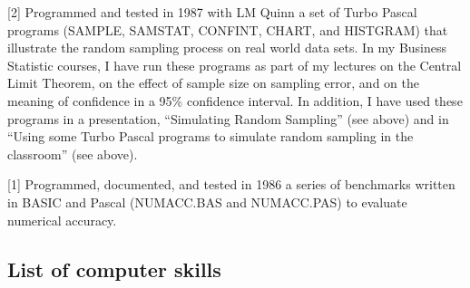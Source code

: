 \documentclass[
  12pt,
]{article}
\begin{document}
{[}2{]} Programmed and tested in 1987 with LM Quinn a set of Turbo
Pascal programs (SAMPLE, SAMSTAT, CONFINT, CHART, and HISTGRAM) that
illustrate the random sampling process on real world data sets. In my
Business Statistic courses, I have run these programs as part of my
lectures on the Central Limit Theorem, on the effect of sample size on
sampling error, and on the meaning of confidence in a 95\% confidence
interval. In addition, I have used these programs in a presentation,
``Simulating Random Sampling'' (see above) and in ``Using some Turbo
Pascal programs to simulate random sampling in the classroom'' (see
above).

{[}1{]} Programmed, documented, and tested in 1986 a series of
benchmarks written in BASIC and Pascal (NUMACC.BAS and NUMACC.PAS) to
evaluate numerical accuracy.

\subsection{List of computer skills}\label{list-of-computer-skills}
\end{document}
